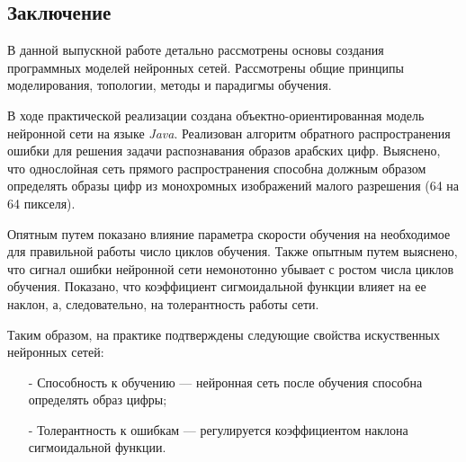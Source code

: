 \begin{center}
\section*{Заключение}
\end{center}

В данной выпускной работе  детально рассмотрены основы создания программных моделей нейронных сетей.
Рассмотрены общие принципы моделирования, топологии, методы и парадигмы обучения.

В ходе практической реализации  создана объектно-ориентированная модель нейронной сети на языке {\it Java}.
Реализован алгоритм обратного распространения ошибки для решения задачи распознавания образов арабских цифр.
Выяснено, что однослойная сеть прямого распространения способна должным образом определять образы цифр из монохромных изображений малого разрешения (64 на 64 пикселя).

Опятным путем  показано влияние параметра скорости обучения на необходимое для правильной работы число циклов обучения.
Также опытным путем выяснено, что сигнал ошибки нейронной сети немонотонно убывает с ростом числа циклов обучения.
Показано, что коэффициент сигмоидальной функции влияет на ее наклон, а, следовательно, на толерантность работы сети.

Таким образом, на практике подтверждены следующие свойства искуственных нейронных сетей:
\begin{itemize}
\item[-] Способность к обучению --- нейронная сеть после обучения способна определять образ цифры;
\item[-] Толерантность к ошибкам --- регулируется коэффициентом наклона сигмоидальной функции.
\end{itemize}


\newpage